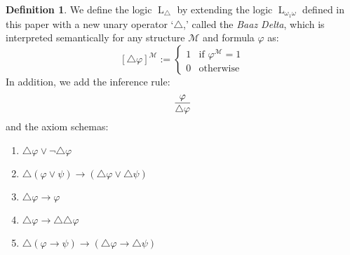 \documentclass{amsart}
\theoremstyle{definition}
\newtheorem{definition}[theorem]{Definition}
\numberwithin{equation}{theorem}
\renewcommand{\phi}{\varphi}
\newcommand{\narrow}[1]{\xrightarrow{#1}}
\renewcommand{\to}{\narrow{}}
\newcommand{\baselang}{\operatorname{L}}
\newcommand{\lang}{\baselang_{\omega_1\omega}}
\begin{document}
\begin{definition}\label{def:baaz}
  We define the logic $\baselang_\triangle$ by extending the logic $\lang$ defined in this paper with a new unary operator `$\triangle$,' called the \emph{Baaz Delta}, which is interpreted semantically for any structure $\mathcal M$ and formula $\phi$ as:
  \[
    [\triangle\phi]^\mathcal M:=\left\{\begin{array}{ll} 
      1&\text{if $\phi^\mathcal M=1$}\\
      0&\text{otherwise}
    \end{array}\right.
  \]
  In addition, we add the inference rule:
  \[
    \infer{\triangle\phi}{\phi}
  \]
  and the axiom schemas:
  \begin{enumerate}[label=(A$\triangle$\arabic*)]
  \item\label{itm:axiom-loe-baaz} $\triangle\phi\vee\neg\triangle\phi$
  \item\label{itm:axiom-vee-baaz} $\triangle(\phi\vee\psi)\to(\triangle\phi\vee\triangle\psi)$
  \item\label{itm:axiom-strict-baaz} $\triangle\phi\to\phi$
  \item\label{itm:axiom-double-strict-baaz} $\triangle\phi\to\triangle\triangle\phi$
  \item\label{itm:axiom-impl-baaz} $\triangle(\phi\to\psi)\to(\triangle\phi\to\triangle\psi)$
  \end{enumerate}
\end{definition}
\end{document}
